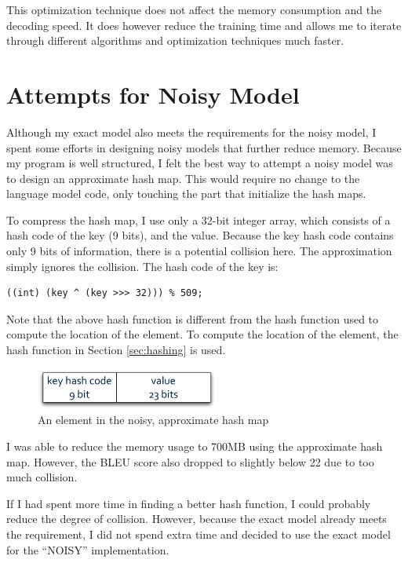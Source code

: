 \documentclass[12pt]{article}   %
\begin{document}
This optimization technique does not affect the memory consumption and the decoding speed. It does however reduce the training time and allows me to iterate through different algorithms and optimization techniques much faster.

\section{Attempts for Noisy Model}
\label{sec:noisy}
Although my exact model also meets the requirements for the noisy model, I spent some efforts in designing noisy models that further reduce memory. Because my program is well structured, I felt the best way to attempt a noisy model was to design an approximate hash map. This would require no change to the language model code, only touching the part that initialize the hash maps.

To compress the hash map, I use only a 32-bit integer array, which consists of a hash code of the key (9 bits), and the value. Because the key hash code contains only 9 bits of information, there is a potential collision here. The approximation simply ignores the collision. The hash code of the key is:
\begin{verbatim}
((int) (key ^ (key >>> 32))) % 509;
\end{verbatim}

Note that the above hash function is different from the hash function used to compute the location of the element. To compute the location of the element, the hash function in Section \ref{sec:hashing} is used.

\begin{figure}[h*]
	\centering
	\includegraphics[width=6cm]{noisy_map.pdf}
	\caption{An element in the noisy, approximate hash map}
	\label{fig:noisy_map}
\end{figure}

I was able to reduce the memory usage to 700MB using the approximate hash map. However, the BLEU score also dropped to slightly below 22 due to too much collision.

If I had spent more time in finding a better hash function, I could probably reduce the degree of collision. However, because the exact model already meets the requirement, I did not spend extra time and decided to use the exact model for the ``NOISY'' implementation.
\end{document}

